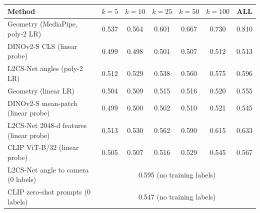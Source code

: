 \begin{tabular}{lcccccc}
\toprule
Method & $k=5$ & $k=10$ & $k=25$ & $k=50$ & $k=100$ & ALL \\
\midrule
Geometry (MediaPipe, poly-2 LR) & 0.537 & 0.564 & 0.601 & 0.667 & 0.730 & 0.810 \\
DINOv2-S CLS (linear probe) & 0.499 & 0.498 & 0.501 & 0.507 & 0.512 & 0.513 \\
L2CS-Net angles (poly-2 LR) & 0.512 & 0.529 & 0.538 & 0.560 & 0.575 & 0.596 \\
\midrule
Geometry (linear LR) & 0.504 & 0.509 & 0.515 & 0.516 & 0.520 & 0.555 \\
DINOv2-S mean-patch (linear probe) & 0.499 & 0.500 & 0.502 & 0.510 & 0.521 & 0.545 \\
L2CS-Net 2048-d features (linear probe) & 0.513 & 0.530 & 0.562 & 0.590 & 0.615 & 0.633 \\
CLIP ViT-B/32 (linear probe) & 0.505 & 0.507 & 0.516 & 0.529 & 0.545 & 0.567 \\
\midrule
L2CS-Net angle to camera (0 labels) & \multicolumn{6}{c}{0.595 (no training labels)} \\
CLIP zero-shot prompts (0 labels) & \multicolumn{6}{c}{0.547 (no training labels)} \\
\bottomrule
\end{tabular}